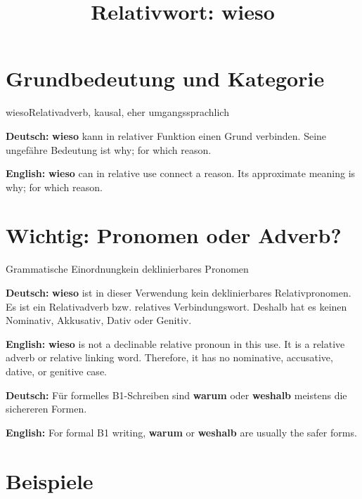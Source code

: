 \documentclass[a4paper,11pt]{article}
\title{Relativwort: \glqq wieso\grqq{}}
\date{}
\newcommand{\GermanText}[1]{\textbf{Deutsch: }#1\par}
\newcommand{\EnglishText}[1]{{\small\color{SoftGray}\textbf{English: }#1\par}}
\begin{document}
\maketitle

\tableofcontents

\newpage

\section{Grundbedeutung und Kategorie}

\begin{grammarentry}{wieso}{Relativadverb, kausal, eher umgangssprachlich}

\GermanText{\textbf{wieso} kann in relativer Funktion einen Grund verbinden. Seine ungefähre Bedeutung ist \glqq why; for which reason\grqq{}.}

\EnglishText{\textbf{wieso} can in relative use connect a reason. Its approximate meaning is \glqq why; for which reason\grqq{}.}

\end{grammarentry}

\section{Wichtig: Pronomen oder Adverb?}

\begin{grammarentry}{Grammatische Einordnung}{kein deklinierbares Pronomen}

\GermanText{\textbf{wieso} ist in dieser Verwendung kein deklinierbares Relativpronomen. Es ist ein Relativadverb bzw. relatives Verbindungswort. Deshalb hat es keinen Nominativ, Akkusativ, Dativ oder Genitiv.}

\EnglishText{\textbf{wieso} is not a declinable relative pronoun in this use. It is a relative adverb or relative linking word. Therefore, it has no nominative, accusative, dative, or genitive case.}

\GermanText{Für formelles B1-Schreiben sind \textbf{warum} oder \textbf{weshalb} meistens die sichereren Formen.}

\EnglishText{For formal B1 writing, \textbf{warum} or \textbf{weshalb} are usually the safer forms.}

\end{grammarentry}

\section{Beispiele}
\end{document}
